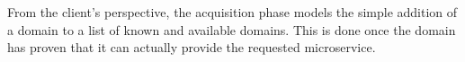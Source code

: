 

From the client's perspective, the acquisition phase models the simple addition of a domain to a list of known and available domains. This is done once the domain has proven that it can actually provide the requested microservice. 






